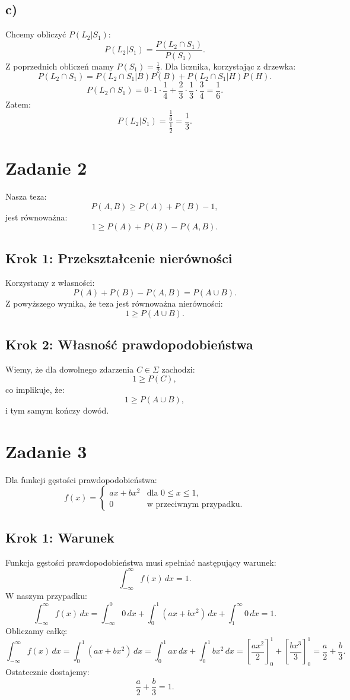 \documentclass[polish, 8pt]{article}
\begin{document}
\subsection*{c)}

Chcemy obliczyć \( P(L_2 | S_1) \):
\[
P(L_2 | S_1) = \frac{P(L_2 \cap S_1)}{P(S_1)}.
\]
Z poprzednich obliczeń mamy \( P(S_1) = \frac{1}{2} \). Dla licznika, korzystając z drzewka:
\[
P(L_2 \cap S_1) = P(L_2 \cap S_1 | B)P(B) + P(L_2 \cap S_1 | H)P(H).
\]
\[
P(L_2 \cap S_1) = 0 \cdot 1 \cdot \frac{1}{4} + \frac{2}{3} \cdot \frac{1}{3} \cdot \frac{3}{4} = \frac{1}{6}.
\]
Zatem:
\[
P(L_2 | S_1) = \frac{\frac{1}{6}}{\frac{1}{2}} = \frac{1}{3}.
\]
\section*{Zadanie 2}
Nasza teza:
\[
P(A, B) \geq P(A) + P(B) - 1,
\]
jest równoważna:
\[
1 \geq P(A) + P(B) - P(A, B).
\]
\subsection*{Krok 1: Przekształcenie nierówności}
Korzystamy z własności:
\[
P(A) + P(B) - P(A, B) = P(A \cup B).
\]
Z powyższego wynika, że teza jest równoważna nierówności:
\[
1 \geq P(A \cup B).
\]
\subsection*{Krok 2: Własność prawdopodobieństwa}
Wiemy, że dla dowolnego zdarzenia \( C \in \Sigma \) zachodzi:
\[
1 \geq P(C),
\]
co implikuje, że:
\[
1 \geq P(A \cup B),
\]
i tym samym kończy dowód.

\section*{Zadanie 3}

Dla funkcji gęstości prawdopodobieństwa:
\[
f(x) =
\begin{cases}
ax + bx^2 & \text{dla } 0 \leq x \leq 1, \\
0 & \text{w przeciwnym przypadku.}
\end{cases}
\]

\subsection*{Krok 1: Warunek}
Funkcja gęstości prawdopodobieństwa musi spełniać następujący warunek:
\[
\int_{-\infty}^\infty f(x) \, dx = 1.
\]
W naszym przypadku:
\[
\int_{-\infty}^\infty f(x) \, dx = \int_{-\infty}^0 0 \, dx +  \int_0^1 (ax + bx^2) \, dx + \int_{1}^\infty 0 \, dx = 1.
\]
Obliczamy całkę:
\[
\int_{-\infty}^\infty f(x) \, dx = \int_0^1 (ax + bx^2) \, dx = \int_0^1 ax \, dx + \int_0^1 bx^2 \, dx = \left[\frac{a x^2}{2}\right]_0^1 + \left[\frac{b x^3}{3}\right]_0^1 = \frac{a}{2} + \frac{b}{3}.
\]
Ostatecznie dostajemy:
\[
\frac{a}{2} + \frac{b}{3} = 1. \tag{1}
\]
\end{document}
